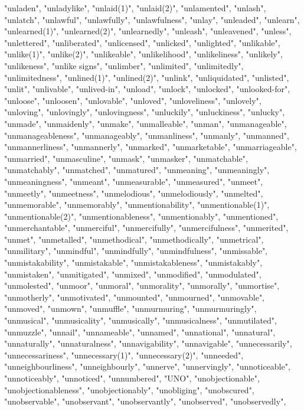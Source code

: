 "unladen",
"unladylike",
"unlaid(1)",
"unlaid(2)",
"unlamented",
"unlash",
"unlatch",
"unlawful",
"unlawfully",
"unlawfulness",
"unlay",
"unleaded",
"unlearn",
"unlearned(1)",
"unlearned(2)",
"unlearnedly",
"unleash",
"unleavened",
"unless",
"unlettered",
"unliberated",
"unlicensed",
"unlicked",
"unlighted",
"unlikable",
"unlike(1)",
"unlike(2)",
"unlikeable",
"unlikelihood",
"unlikeliness",
"unlikely",
"unlikeness",
"unlike signs",
"unlimber",
"unlimited",
"unlimitedly",
"unlimitedness",
"unlined(1)",
"unlined(2)",
"unlink",
"unliquidated",
"unlisted",
"unlit",
"unlivable",
"unlived-in",
"unload",
"unlock",
"unlocked",
"unlooked-for",
"unloose",
"unloosen",
"unlovable",
"unloved",
"unloveliness",
"unlovely",
"unloving",
"unlovingly",
"unlovingness",
"unluckily",
"unluckiness",
"unlucky",
"unmade",
"unmaidenly",
"unmake",
"unmalleable",
"unman",
"unmanageable",
"unmanageableness",
"unmanageably",
"unmanliness",
"unmanly",
"unmanned",
"unmannerliness",
"unmannerly",
"unmarked",
"unmarketable",
"unmarriageable",
"unmarried",
"unmasculine",
"unmask",
"unmasker",
"unmatchable",
"unmatchably",
"unmatched",
"unmatured",
"unmeaning",
"unmeaningly",
"unmeaningness",
"unmeant",
"unmeasurable",
"unmeasured",
"unmeet",
"unmeetly",
"unmeetness",
"unmelodious",
"unmelodiously",
"unmelted",
"unmemorable",
"unmemorably",
"unmentionability",
"unmentionable(1)",
"unmentionable(2)",
"unmentionableness",
"unmentionably",
"unmentioned",
"unmerchantable",
"unmerciful",
"unmercifully",
"unmercifulness",
"unmerited",
"unmet",
"unmetalled",
"unmethodical",
"unmethodically",
"unmetrical",
"unmilitary",
"unmindful",
"unmindfully",
"unmindfulness",
"unmissable",
"unmistakability",
"unmistakable",
"unmistakableness",
"unmistakably",
"unmistaken",
"unmitigated",
"unmixed",
"unmodified",
"unmodulated",
"unmolested",
"unmoor",
"unmoral",
"unmorality",
"unmorally",
"unmortise",
"unmotherly",
"unmotivated",
"unmounted",
"unmourned",
"unmovable",
"unmoved",
"unmown",
"unmuffle",
"unmurmuring",
"unmurmuringly",
"unmusical",
"unmusicality",
"unmusically",
"unmusicalness",
"unmutilated",
"unmuzzle",
"unnail",
"unnameable",
"unnamed",
"unnational",
"unnatural",
"unnaturally",
"unnaturalness",
"unnavigability",
"unnavigable",
"unnecessarily",
"unnecessariness",
"unnecessary(1)",
"unnecessary(2)",
"unneeded",
"unneighbourliness",
"unneighbourly",
"unnerve",
"unnervingly",
"unnoticeable",
"unnoticeably",
"unnoticed",
"unnumbered",
"UNO",
"unobjectionable",
"unobjectionableness",
"unobjectionably",
"unobliging",
"unobscured",
"unobservable",
"unobservant",
"unobservantly",
"unobserved",
"unobservedly",
